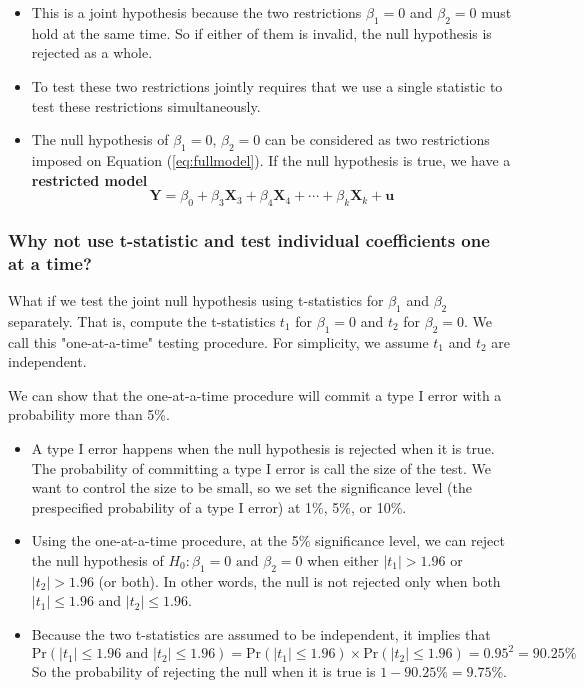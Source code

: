 \documentclass[a4paper,11pt]{article}
\newcommand{\pr}{\mathrm{Pr}}
\begin{document}
\begin{itemize}
\item This is a joint hypothesis because the two restrictions \(\beta_1=0\)
and \(\beta_2=0\) must hold at the same time. So if either of them is
invalid, the null hypothesis is rejected as a whole.

\item To test these two restrictions jointly requires that we use a
single statistic to test these restrictions simultaneously.

\item The null hypothesis of \(\beta_1 = 0,\, \beta_2 = 0\) can be
considered as two restrictions imposed on Equation
(\ref{eq:fullmodel}). If the null hypothesis is true, we have a
\textbf{restricted model}
\begin{equation}
\label{eq:restmodel-1}
\mathbf{Y} = \beta_0 + \beta_3 \mathbf{X}_3 + \beta_4 \mathbf{X}_4 + \cdots + \beta_k \mathbf{X}_k + \mathbf{u}
\end{equation}
\end{itemize}


\subsubsection*{Why not use t-statistic and test individual coefficients one at a time?}
\label{sec:orgfdb9694}

What if we test the joint null hypothesis using t-statistics for
\(\beta_1\) and \(\beta_2\) separately. That is, compute the t-statistics
\(t_1\) for \(\beta_1 = 0\) and \(t_2\) for \(\beta_2 = 0\). We call this
"one-at-a-time" testing procedure. For simplicity, we assume \(t_1\) and
\(t_2\) are independent.

We can show that the one-at-a-time procedure will commit a type I
error with a probability more than 5\%.

\begin{itemize}
\item A type I error happens when the null hypothesis is rejected when it
is true. The probability of committing a type I error is call the
size of the test. We want to control the size to be small, so we set
the significance level (the prespecified probability of a type I
error) at 1\%, 5\%, or 10\%.

\item Using the one-at-a-time procedure, at the 5\% significance level, we
can reject the null hypothesis of \(H_0: \beta_1 = 0 \text{ and }
  \beta_2 = 0\) when either \(|t_1| > 1.96\) or \(|t_2| > 1.96\) (or
both). In other words, the null is not rejected only when both
\(|t_1| \leq 1.96\) and \(|t_2| \leq 1.96\).

\item Because the two t-statistics are assumed to be independent, it
implies that
\[\pr(|t_1| \leq 1.96 \text{ and } |t_2| \leq 1.96) = \pr(|t_1| \leq
  1.96) \times \pr(|t_2| \leq 1.96) = 0.95^2 = 90.25\%\]
So the probability of rejecting the null when it is true is \(1 -
  90.25\% = 9.75\%\).
\end{itemize}
\end{document}
